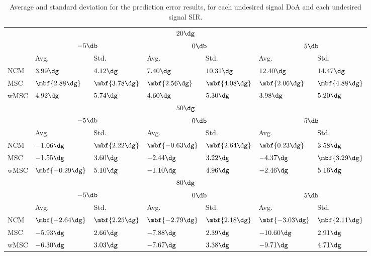 \begin{table}[!t]
	\centering
	\renewcommand{\arraystretch}{1.4}
	\begin{tabular}{l l l l l l l}
		\multicolumn{7}{c}{$20\dg$} \\
		\hhline{=======}
		& \multicolumn{2}{c}{$-5\db$} & \multicolumn{2}{c}{$0\db$} & \multicolumn{2}{c}{$5\db$} \\
		\hline
		& Avg. & Std. & Avg. & Std. & Avg. & Std. \\
		\hline
		NCM    & $3.99\dg$         & $4.12\dg$         & $7.40\dg$         & $10.31\dg$        & $12.40\dg$        & $14.47\dg$       \\
		MSC    & $\mbf{2.88\dg}$   & $\mbf{3.78\dg}$   & $\mbf{2.56\dg}$   & $\mbf{4.08\dg}$   & $\mbf{2.06\dg}$   & $\mbf{4.88\dg}$  \\
		wMSC   & $4.92\dg$         & $5.74\dg$         & $4.60\dg$         & $5.30\dg$         & $3.98\dg$         & $5.20\dg$        \\[1em]
		\multicolumn{7}{c}{$50\dg$} \\
		\hhline{=======}
		& \multicolumn{2}{c}{$-5\db$} & \multicolumn{2}{c}{$0\db$} & \multicolumn{2}{c}{$5\db$} \\
		\hline
		& Avg. & Std. & Avg. & Std. & Avg. & Std. \\
		\hline
		NCM    & $-1.06\dg$        & $\mbf{2.22\dg}$   & $\mbf{-0.63\dg}$  & $\mbf{2.64\dg}$   & $\mbf{0.23\dg}$   & $3.58\dg$        \\
		MSC    & $-1.55\dg$        & $3.60\dg$         & $-2.44\dg$        & $3.22\dg$         & $-4.37\dg$        & $\mbf{3.29\dg}$  \\
		wMSC   & $\mbf{-0.29\dg}$  & $5.10\dg$         & $-1.10\dg$        & $4.96\dg$         & $-2.46\dg$        & $5.16\dg$        \\[1em]
		\multicolumn{7}{c}{$80\dg$} \\
		\hhline{=======}
		& \multicolumn{2}{c}{$-5\db$} & \multicolumn{2}{c}{$0\db$} & \multicolumn{2}{c}{$5\db$} \\
		\hline
		& Avg. & Std. & Avg. & Std. & Avg. & Std. \\
		\hline
		NCM    & $\mbf{-2.64\dg}$  & $\mbf{2.25\dg}$   & $\mbf{-2.79\dg}$  & $\mbf{2.18\dg}$   & $\mbf{-3.03\dg}$  & $\mbf{2.11\dg}$  \\
		MSC    & $-5.93\dg$        & $2.66\dg$         & $-7.88\dg$        & $2.39\dg$         & $-10.60\dg$       & $2.91\dg$        \\
		wMSC   & $-6.30\dg$        & $3.03\dg$         & $-7.67\dg$        & $3.38\dg$         & $-9.71\dg$        & $4.71\dg$        
	\end{tabular}
	\caption{Average and standard deviation for the prediction error results, for each undesired signal DoA and each undesired signal SIR.}
	\label{tab:sec3:error__each_DOA__each_SIR}
\end{table}